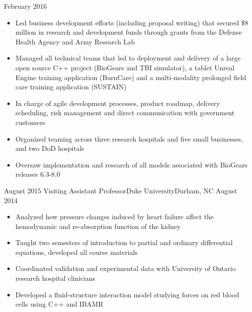 \begin{experiences}
    {February 2016}{
                      \begin{itemize}
                        \item Led business development efforts (including proposal writing) that secured \$8 million in research and development funds through grants from the Defense Health Agency and Army Research Lab
                        \item Managed all technical teams that led to deployment and delivery of a large open source C++ project (BioGears and TBI simulator), a tablet Unreal Engine training application (BurnCare) and a multi-modality prolonged field care training application (SUSTAIN)                       
                        \item In charge of agile development processes, product roadmap, delivery scheduling, risk management and direct communication with government customers
                        \item Organized teaming across three research hospitals and five small businesses, and two DoD hospitals
                        \item Oversaw implementation and research of all models associated with BioGears releases 6.3-8.0                                                   
                      \end{itemize}
                    }
                    {}
  \emptySeparator
  \experience
    {August 2015}     {Visiting Assistant Professor}{Duke University}{Durham, NC}
    {August 2014}{
                      \begin{itemize}
                        \item Analyzed how pressure changes induced by heart failure affect the hemodynamic and re-absorption function of the kidney
                        \item Taught two semesters of introduction to partial and ordinary differential equations, developed all course materials                
                        \item Coordinated validation and experimental data with University of Ontario research hospital clinicians                   
                        \item Developed a fluid-structure interaction model studying forces on red blood cells using C++ and IBAMR
                      \end{itemize}
                    }
                    {}

\end{experiences}
